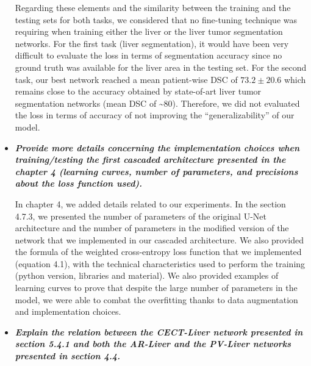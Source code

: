 \documentclass{article}
\begin{document}
\begin{itemize}
Regarding these elements and the similarity between the training and the testing sets for both tasks, we considered that no fine-tuning technique was requiring when training either the liver or the liver tumor segmentation networks. For the first task (liver segmentation), it would have been very difficult to evaluate the loss in terms of segmentation accuracy since no ground truth was available for the liver area in the testing set. For the second task, our best network reached a mean patient-wise DSC of $ 73.2 \pm 20.6 $ which remains close to the accuracy obtained by state-of-art liver tumor segmentation networks (mean DSC of \textasciitilde{}80). Therefore, we did not evaluated the loss in terms of accuracy of not improving the ``generalizability'' of our model.

\item \textit{\textbf{Provide more details concerning the implementation choices when training/testing the first cascaded architecture presented in the chapter 4 (learning curves, number of parameters, and precisions about the loss function used).}}

In chapter 4, we added details related to our experiments. 
In the section 4.7.3, we presented the number of parameters of the original U-Net architecture and the number of parameters in the modified version of the network that we implemented in our cascaded architecture. We also provided the formula of the weighted cross-entropy loss function that we implemented (equation 4.1), with the technical characteristics used to perform the training (python version, libraries and material).
We also provided examples of learning curves to prove that despite the large number of parameters in the model, we were able to combat the overfitting thanks to data augmentation and implementation choices.

\item \textit{\textbf{Explain the relation between the CECT-Liver network presented in section 5.4.1 and both the AR-Liver and the PV-Liver networks presented in section 4.4.}}


\end{itemize}
\end{document}
